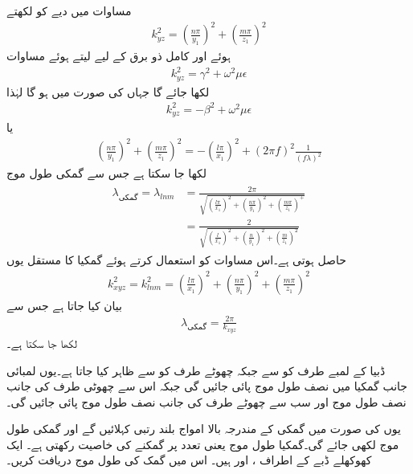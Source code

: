 مساوات  میں دیے  کو  لکھتے
\begin{align}
k_{yz}^2=\left( \frac{n \pi}{y_1}\right)^2+\left( \frac{m \pi}{z_1}\right)^2
\end{align}
ہوئے اور کامل ذو برق کے لیے  لیتے ہوئے  مساوات  
\begin{align*}
k_{yz}^2=\gamma^2+\omega^2 \mu \epsilon
\end{align*}
لکھا جائے گا جہاں  کی صورت میں  ہو گا لہٰذا
\begin{align*}
k_{yz}^2=-\beta^2+\omega^2 \mu \epsilon
\end{align*}
یا
\begin{align*}
\left( \frac{n \pi}{y_1}\right)^2+\left( \frac{m \pi}{z_1}\right)^2=-\left(\frac{l \pi}{x_1}\right)^2+\left(2\pi f\right)^2 \frac{1}{\left(f \lambda\right)^2}
\end{align*}
لکھا جا سکتا ہے جس سے گمکی طول موج
\begin{gather}
\begin{aligned}\label{مساوات_مویج_گمک_طول_موج}
\lambda_{\text{گمکی}}=\lambda_{lnm}&=
\frac{2\pi}{\sqrt{\left(\frac{l \pi}{x_1}\right)^2+\left( \frac{n \pi}{y_1}\right)^2+\left( \frac{m \pi}{z_1}\right)^+}}\\
&=\frac{2}{\sqrt{\left(\frac{l}{x_1}\right)^2+\left( \frac{n }{y_1}\right)^2+\left( \frac{m}{z_1}\right)^2}}
\end{aligned}
\end{gather}
حاصل ہوتی ہے۔اس مساوات کو استعمال کرتے ہوئے گمکیا کا مستقل  یوں
\begin{align}
k_{xyz}^2=k_{lnm}^2=\left(\frac{l \pi}{x_1}\right)^2+\left( \frac{n \pi}{y_1}\right)^2+\left( \frac{m \pi}{z_1}\right)^2
\end{align}
 بیان کیا جاتا ہے جس سے 
\begin{align}
\lambda_{\text{گمکی}}=\frac{2\pi}{k_{xyz}}
\end{align}
لکھا جا سکتا ہے۔

ڈبیا کے  لمبے طرف کو  سے  جبکہ چھوٹے طرف کو  سے ظاہر کیا جاتا ہے۔یوں لمبائی جانب گمکیا میں  نصف طول موج پائی جائیں گی جبکہ اس سے چھوٹی طرف کی جانب  نصف طول موج اور سب سے چھوٹے طرف کی جانب  نصف طول موج پائی جائیں گی۔

یوں  کی صورت میں گمکی کے مندرجہ بالا امواج بلند رتبی  کہلائیں گے اور گمکی طول موج  لکھی جائے گی۔گمکیا  طول موج یعنی  تعدد پر گمکنے کی خاصیت رکھتی ہے۔ 
ایک کھوکھلے ڈبے کے اطراف ،  اور  ہیں۔ اس میں  گمک کی طول موج  دریافت کریں۔

